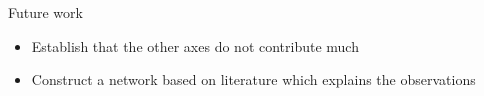 \documentclass[aspectratio=169,9pt]{beamer}
\begin{document}
    \begin{frame}{Future work}
        \begin{itemize}
            \item Establish that the other axes do not contribute much
            \item Construct a network based on literature which explains the observations
        \end{itemize}
    \end{frame}

    \begin{frame}[allowframebreaks]
        \printbibliography
    \end{frame}
\end{document}
